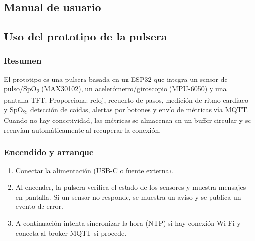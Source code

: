 \documentclass[12pt, a4paper]{article}
\begin{document}
\begin{umaappendices}
	
	\section{Manual de usuario}
	
	\subsection{Uso del prototipo de la pulsera}
	
	\subsubsection{Resumen}
	El prototipo es una pulsera basada en un ESP32 que integra un sensor de pulso/SpO\textsubscript{2} (MAX30102), un acelerómetro/giroscopio (MPU-6050) y una pantalla TFT. Proporciona: reloj, recuento de pasos, medición de ritmo cardiaco y SpO\textsubscript{2}, detección de caídas, alertas por botones y envío de métricas vía MQTT. Cuando no hay conectividad, las métricas se almacenan en un buffer circular y se reenvían automáticamente al recuperar la conexión.
	
	\subsubsection{Encendido y arranque}
	\begin{enumerate}
		\item Conectar la alimentación (USB-C o fuente externa).
		\item Al encender, la pulsera verifica el estado de los sensores y muestra mensajes en pantalla. Si un sensor no responde, se muestra un aviso y se publica un evento de error.
		\item A continuación intenta sincronizar la hora (NTP) si hay conexión Wi-Fi y conecta al broker MQTT si procede.
	\end{enumerate}
	

\end{umaappendices}
\end{document}
